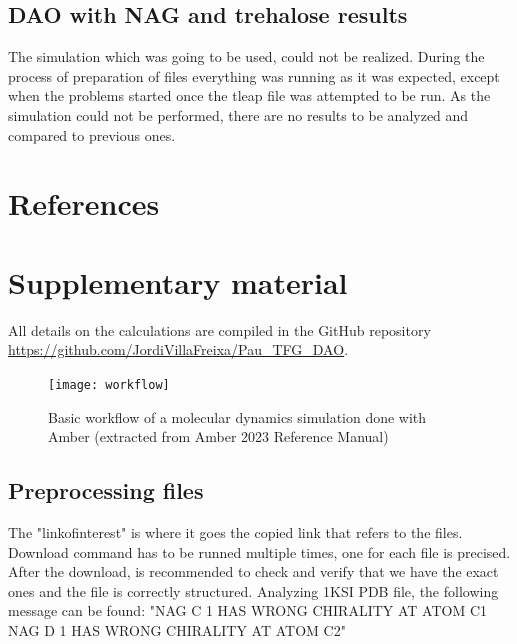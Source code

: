 \documentclass[a4paper]{article}
\begin{document}
\subsection{DAO with NAG and trehalose results}

The simulation which was going to be used, could not be realized. During the process of preparation of files everything was running as it was expected, except when the problems started once the tleap file was attempted to be run.
As the simulation could not be performed, there are no results to be analyzed and compared to previous ones.
	
\newpage
\section{References}

\newpage
\appendix


\section{Supplementary material}

\setcounter{figure}{0}%
\let\oldthefigure\thefigure%
\renewcommand{\thefigure}{S\oldthefigure}%

All details on the calculations are compiled in the GitHub repository \href{https://github.com/JordiVillaFreixa/Pau\_TFG\_DAO}{https://github.com/JordiVillaFreixa/Pau\_TFG\_DAO}.


\begin{figure}[h]
\centering
\texttt{[image: workflow]}
\caption{Basic workflow of a molecular dynamics simulation done with Amber (extracted from Amber 2023 Reference Manual)}
\label{fig:workflow}
\end{figure}

\subsection{Preprocessing files}

    
The "linkofinterest" is where it goes the copied link that refers to the files. Download command has to be runned multiple times, one for each file is precised.
After the download, is recommended to check and verify that we have the exact ones and the file is correctly structured. Analyzing 1KSI PDB file, the following message can be found: "NAG C 1 HAS WRONG CHIRALITY AT ATOM C1 NAG D 1 HAS WRONG CHIRALITY AT ATOM C2" 
\end{document}
